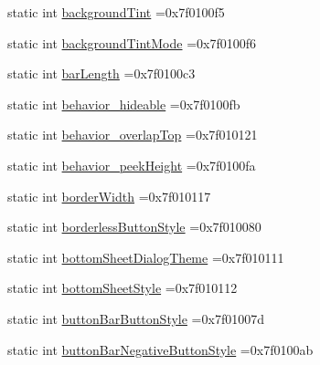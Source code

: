 \begin{DoxyCompactItemize}
\item 
static int \hyperlink{classandroid_1_1support_1_1graphics_1_1drawable_1_1animated_1_1R_1_1attr_aa7855b034b2fceddb7e91dc29163c1cf}{background\+Tint} =0x7f0100f5
\item 
static int \hyperlink{classandroid_1_1support_1_1graphics_1_1drawable_1_1animated_1_1R_1_1attr_acc2fcfdb50e21b90ba79c4ec007a46d6}{background\+Tint\+Mode} =0x7f0100f6
\item 
static int \hyperlink{classandroid_1_1support_1_1graphics_1_1drawable_1_1animated_1_1R_1_1attr_a5837fa3172db060ddc1dd807a25b6db5}{bar\+Length} =0x7f0100c3
\item 
static int \hyperlink{classandroid_1_1support_1_1graphics_1_1drawable_1_1animated_1_1R_1_1attr_ac91c5005e6964e37f221af84cff9e08c}{behavior\+\_\+hideable} =0x7f0100fb
\item 
static int \hyperlink{classandroid_1_1support_1_1graphics_1_1drawable_1_1animated_1_1R_1_1attr_a099a1a029952ff1934e5f43dfa0c3dac}{behavior\+\_\+overlap\+Top} =0x7f010121
\item 
static int \hyperlink{classandroid_1_1support_1_1graphics_1_1drawable_1_1animated_1_1R_1_1attr_aea3d030f7d8a3d4a972d27bab3520694}{behavior\+\_\+peek\+Height} =0x7f0100fa
\item 
static int \hyperlink{classandroid_1_1support_1_1graphics_1_1drawable_1_1animated_1_1R_1_1attr_a04cf27e5000af194fa50c79f4d58c1c8}{border\+Width} =0x7f010117
\item 
static int \hyperlink{classandroid_1_1support_1_1graphics_1_1drawable_1_1animated_1_1R_1_1attr_a728fe1d2d08403acdef3672fe6d10d04}{borderless\+Button\+Style} =0x7f010080
\item 
static int \hyperlink{classandroid_1_1support_1_1graphics_1_1drawable_1_1animated_1_1R_1_1attr_a705ff52805f048fcd8ec41d4aa96172f}{bottom\+Sheet\+Dialog\+Theme} =0x7f010111
\item 
static int \hyperlink{classandroid_1_1support_1_1graphics_1_1drawable_1_1animated_1_1R_1_1attr_aeabe7907fc4c0fc017e92648db8dcacc}{bottom\+Sheet\+Style} =0x7f010112
\item 
static int \hyperlink{classandroid_1_1support_1_1graphics_1_1drawable_1_1animated_1_1R_1_1attr_a45442733a761e3b3d34220c3e63a9fe9}{button\+Bar\+Button\+Style} =0x7f01007d
\item 
static int \hyperlink{classandroid_1_1support_1_1graphics_1_1drawable_1_1animated_1_1R_1_1attr_a11e71ab9d303377a0be17bb5c6313952}{button\+Bar\+Negative\+Button\+Style} =0x7f0100ab
\item 

\end{DoxyCompactItemize}
